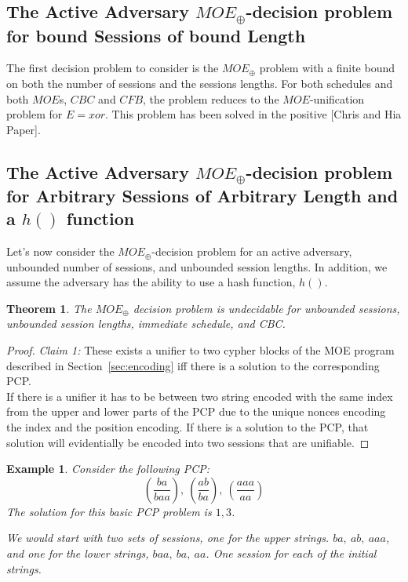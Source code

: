 \documentclass[11pt,twoside,a4paper]{article}
\newtheorem{example}{Example}
\newtheorem{theorem}{Theorem}
\begin{document}
{\subsection{The Active Adversary $MOE_{\oplus}$-decision problem for bound Sessions of bound Length}
The first decision problem to consider is the $MOE_{\oplus}$
problem with a finite bound on both the number of sessions and
the sessions lengths. 
For both schedules and both $MOE$s, $CBC$ and $CFB$, the problem
reduces to the $MOE$-unification problem for $E=xor$. This problem
has been solved in the positive [Chris and Hia Paper].

\subsection{The Active Adversary $MOE_{\oplus}$-decision problem for Arbitrary Sessions of Arbitrary Length and a $h()$ function}
Let's now consider the $MOE_{\oplus}$-decision problem
for an active adversary, unbounded number of sessions, and unbounded session lengths. In addition, we assume the adversary has the ability 
to use a hash function, $h()$.
 
\begin{theorem}\label{thm:unbounded_unbounded}
The $MOE_{\oplus}$ decision problem is undecidable for unbounded 
sessions, unbounded session lengths, immediate schedule, and CBC. 
\end{theorem}
\begin{proof}
	\textit{Claim 1:} These exists a unifier to two cypher blocks
	of the MOE program described in Section~\ref{sec:encoding} iff
	there is a solution to the corresponding PCP.
	\noindent
	\\
	If there is a unifier it has to be between two string encoded 
	with the same index from the upper and lower parts of the PCP
	due to the unique nonces encoding the index and the position encoding.
	If there is a solution to the PCP, that solution will evidentially
	be encoded into two sessions that are unifiable. 
\end{proof}

\begin{example}
	Consider the following PCP:
	\[
	(\frac{ba}{baa}),~(\frac{ab}{ba}),~(\frac{aaa}{aa})
	\]
	The solution for this basic PCP problem is $1,3$.
	
	We would start with two sets of sessions, one for the 
	upper strings. $ba, ~ab, ~aaa$, and one for the lower
	strings, $baa, ~ba, ~aa$. One session for each of the initial strings. 
	

\end{example}}
\end{document}
